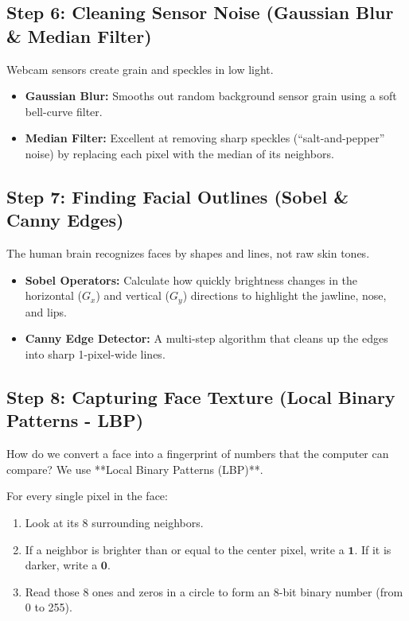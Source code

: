 \documentclass[11pt,a4paper]{article}
\begin{document}
\subsection{Step 6: Cleaning Sensor Noise (Gaussian Blur \& Median Filter)}
Webcam sensors create grain and speckles in low light. 
\begin{itemize}[leftmargin=1.5em]
    \item \textbf{Gaussian Blur:} Smooths out random background sensor grain using a soft bell-curve filter.
    \item \textbf{Median Filter:} Excellent at removing sharp speckles (``salt-and-pepper'' noise) by replacing each pixel with the median of its neighbors.
\end{itemize}

\subsection{Step 7: Finding Facial Outlines (Sobel \& Canny Edges)}
The human brain recognizes faces by shapes and lines, not raw skin tones.
\begin{itemize}[leftmargin=1.5em]
    \item \textbf{Sobel Operators:} Calculate how quickly brightness changes in the horizontal ($G_x$) and vertical ($G_y$) directions to highlight the jawline, nose, and lips.
    \item \textbf{Canny Edge Detector:} A multi-step algorithm that cleans up the edges into sharp 1-pixel-wide lines.
\end{itemize}

\subsection{Step 8: Capturing Face Texture (Local Binary Patterns - LBP)}
How do we convert a face into a fingerprint of numbers that the computer can compare? We use **Local Binary Patterns (LBP)**.

For every single pixel in the face:
\begin{enumerate}[leftmargin=1.5em]
    \item Look at its 8 surrounding neighbors.
    \item If a neighbor is brighter than or equal to the center pixel, write a $\mathbf{1}$. If it is darker, write a $\mathbf{0}$.
    \item Read those 8 ones and zeros in a circle to form an 8-bit binary number (from 0 to 255).
\end{enumerate}
\end{document}
